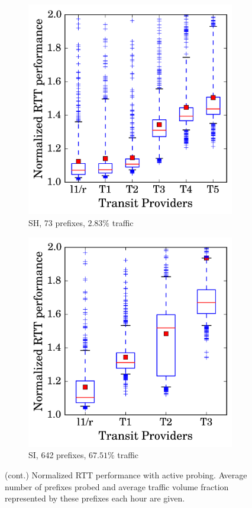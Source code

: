 \begin{figure}
\begin{subfigure}[b]{0.48\textwidth}
                \includegraphics[width=\textwidth]{gfx/chap2/np_box_sh.png}
                \caption{SH, 73 prefixes, $2.83\%$ traffic}
                \label{fig:np_sh}
        \end{subfigure}
        \begin{subfigure}[b]{0.48\textwidth}
                \includegraphics[width=\textwidth]{gfx/chap2/np_box_si.png}
                \caption{SI, 642 prefixes, $67.51\%$ traffic}
                \label{fig:np_si}
        \end{subfigure}
\caption{(cont.) Normalized RTT performance with active probing. Average number of prefixes probed and average traffic volume fraction represented by these prefixes each hour are given.}
\label{fig:np_cont}
\end{figure}

